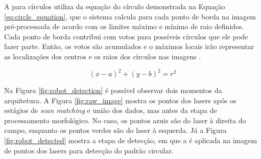 \documentclass[acronym, symbols, table]{fei}
\begin{document}
				A  para círculos utiliza da equação do círculo demonstrada na Equação \eqref{eq:circle_equation}, que o sistema calcula para cada ponto de borda na imagem pré-processada de acordo com os limites máximo e mínimo de raio definidos. Cada ponto de borda contribui com votos para possíveis círculos que ele pode fazer parte. Então, os votos são acumulados e o máximos locais irão representar as localizações dos centros e os raios dos círculos nas imagens \cite{hassanein2015survey}.

%				
				\begin{equation}
					\label{eq:circle_equation}
					(x-a)^2 + (y-b)^2 = r^2
				\end{equation}
			
				Na Figura \ref{fig:robot_detection} é possível observar dois momentos da arquitetura. A Figura \ref{fig:raw_image} mostra os pontos dos lasers após os estágios de \textit{scan matching} e união dos dados, mas antes da etapa de processamento morfológico. No caso, os pontos azuis são do laser à direita do campo, enquanto os pontos verdes são do laser à esquerda. Já a Figura \ref{fig:robot_detected} mostra a etapa de detecção, em que a  é aplicada na imagem de pontos dos lasers para detecção do padrão circular.
				
\end{document}
